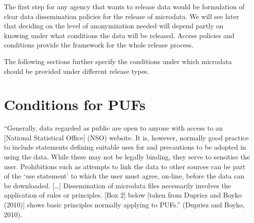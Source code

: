 \documentclass[letterpaper,10pt,english]{sphinxmanual}
\begin{document}
The first step for any agency that wants to release data would be
formulation of clear data dissemination policies for the release of
microdata. We will see later that deciding on the level of anonymization
needed will depend partly on knowing under what conditions the data will
be released. Access policies and conditions provide the framework for
the whole release process.

The following sections further specify the conditions under which
microdata should be provided under different release types.


\section{Conditions for PUFs}
\label{\detokenize{release_types:conditions-for-pufs}}
“Generally, data regarded as public are open to anyone with access to an
{[}National Statistical Office{]} (NSO) website. It is, however, normally
good practice to include statements defining suitable uses for and
precautions to be adopted in using the data. While these may not be
legally binding, they serve to sensitise the user. Prohibitions such as
attempts to link the data to other sources can be part of the ‘use
statement’ to which the user must agree, on-line, before the data can be
downloaded. {[}…{]} Dissemination of microdata files necessarily involves
the application of rules or principles. {[}Box 2{]} below {[}taken from
Dupriez and Boyko (2010){]} shows basic principles normally applying to
PUFs.” (Dupriez and Boyko, 2010).
\end{document}
